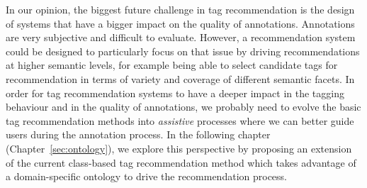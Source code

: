 In our opinion, the biggest future challenge in tag recommendation is the design of systems that have a bigger impact on the quality of annotations. Annotations are very subjective and difficult to evaluate. However, a recommendation system could be designed to particularly focus on that issue by driving recommendations at higher semantic levels, for example being able to select candidate tags for recommendation in terms of variety and coverage of different semantic facets. 
In order for tag recommendation systems to have a deeper impact in the tagging behaviour and in the quality of annotations, we probably need to evolve the basic tag recommendation methods into \emph{assistive} processes where we can better guide users during the annotation process. %
In the following chapter (Chapter~\ref{sec:ontology}), we explore this perspective by proposing an extension of the current class-based tag recommendation method which takes advantage of a domain-specific ontology to drive the recommendation process.


